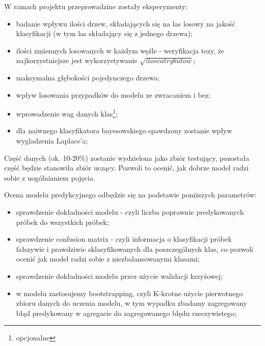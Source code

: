 W ramach projektu przeprowadzine zostały eksperymenty:
\begin{itemize}
    \item badanie wpływu ilości drzew, składających się na las losowy na jakość klasyfikacji (w tym las składający się z jednego drzewa);
    \item ilości zmiennych losowanych w każdym węźle - weryfikacja tezy, że najkorzystniejsze jest wykorzystywanie $\sqrt {ilosc atrybutow}$;
    \item maksymalna głębokości pojedynczego drzewa;
    \item wpływ losowania przypadków do modelu ze zwracaniem i bez;
    
    
    \item wprowadzenie wag danych klas\footnote[1]{opcjonalne};
    \item dla naiwnego klasyfikatora bayesowskiego spawdzony zostanie wpływ wygladzenia Laplace'a;
        
\end{itemize}

Część danych (ok. 10-20\%) zostanie wydzielona jako zbiór testujący, pozostała część będzie stanowiła zbiór uczący. Pozwoli to ocenić, jak dobrze model radzi sobie z uogólnianiem pojęcia. 

Ocena modelu predykcyjnego odbędzie się na podstawie poniższych parametrów:
\begin{itemize}
        
 
    \item sprawdzenie dokładności modelu - czyli liczba poprawnie predykowanych próbek do wszystkich próbek;    
    \item sprawdzenie confusion matrix - czyli informacja o klasyfikacji próbek fałszywie i prawdziwie sklasyfikowanych dla poszczególnych klas, co pozwoli ocenić jak model radzi sobie z niezbalansowanymi klasami;

    \item sprawdzenie dokładności modelu przez użycie walidacji krzyżowej;
    \item w modelu zastosujemy bootstrapping, czyli K-krotne użycie pierwotnego zbioru danych do uczenia modelu, w tym wypadku zbadamy zagregowany błąd predykowany w agregacie do zagregowanego błędu rzeczywistego;
\end{itemize}

